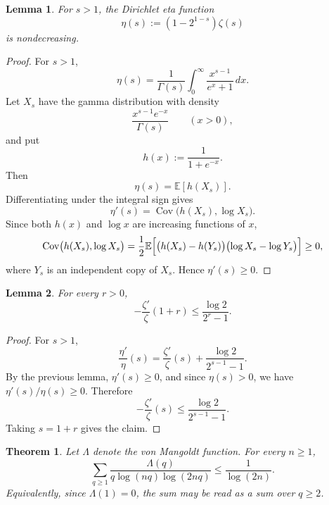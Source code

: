 \documentclass{amsart}
\newtheorem{theorem}{Theorem}
\newtheorem{lemma}{Lemma}
\DeclareMathOperator{\Cov}{Cov}
\begin{document}
\begin{lemma}
For \(s>1\), the Dirichlet eta function
\[
\eta(s):=(1-2^{1-s})\zeta(s)
\]
is nondecreasing.
\end{lemma}

\begin{proof}
For \(s>1\),
\[
\eta(s)
=
\frac{1}{\Gamma(s)}
\int_0^\infty \frac{x^{s-1}}{e^x+1}\,dx.
\]
Let \(X_s\) have the gamma distribution with density
\[
\frac{x^{s-1}e^{-x}}{\Gamma(s)}
\qquad (x>0),
\]
and put
\[
h(x):=\frac{1}{1+e^{-x}}.
\]
Then
\[
\eta(s)=\mathbb E[h(X_s)].
\]
Differentiating under the integral sign gives
\[
\eta'(s)
=
\Cov\bigl(h(X_s),\log X_s\bigr).
\]
Since both \(h(x)\) and \(\log x\) are increasing functions of \(x\),
\[
\Cov\bigl(h(X_s),\log X_s\bigr)
=
\frac12
\mathbb E\Bigl[
\bigl(h(X_s)-h(Y_s)\bigr)
\bigl(\log X_s-\log Y_s\bigr)
\Bigr]
\ge 0,
\]
where \(Y_s\) is an independent copy of \(X_s\). Hence \(\eta'(s)\ge 0\).
\end{proof}

\begin{lemma}
For every \(r>0\),
\[
-\frac{\zeta'}{\zeta}(1+r)
\le
\frac{\log 2}{2^r-1}.
\]
\end{lemma}

\begin{proof}
For \(s>1\),
\[
\frac{\eta'}{\eta}(s)
=
\frac{\zeta'}{\zeta}(s)
+
\frac{\log 2}{2^{s-1}-1}.
\]
By the previous lemma, \(\eta'(s)\ge 0\), and since \(\eta(s)>0\), we have
\(\eta'(s)/\eta(s)\ge 0\). Therefore
\[
-\frac{\zeta'}{\zeta}(s)
\le
\frac{\log 2}{2^{s-1}-1}.
\]
Taking \(s=1+r\) gives the claim.
\end{proof}

\begin{theorem}
Let \(\Lambda\) denote the von Mangoldt function. For every \(n\ge 1\),
\[
\sum_{q\ge 1}
\frac{\Lambda(q)}{q\log(nq)\log(2nq)}
\le
\frac{1}{\log(2n)}.
\]
Equivalently, since \(\Lambda(1)=0\), the sum may be read as a sum over
\(q\ge 2\).
\end{theorem}
\end{document}
